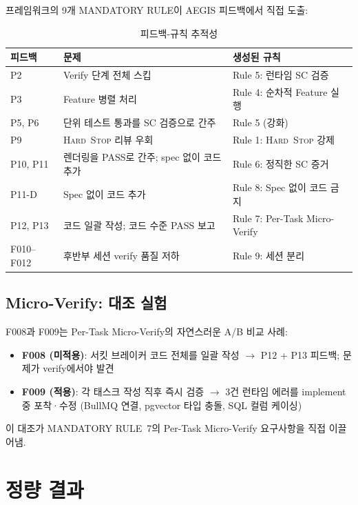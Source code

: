 \documentclass[11pt,a4paper,openright,twoside]{report}
\newcommand{\hardstop}{\textsc{Hard~Stop}}
\begin{document}
프레임워크의 9개 MANDATORY RULE이 AEGIS 피드백에서 직접 도출:

\begin{table}[H]
\centering
\caption{피드백-규칙 추적성}
\label{tab:aegis-rules-ko}
\begin{tabularx}{\textwidth}{lXl}
\toprule
\textbf{피드백} & \textbf{문제} & \textbf{생성된 규칙} \\
\midrule
P2 & Verify 단계 전체 스킵 & Rule 5: 런타임 SC 검증 \\
P3 & Feature 병렬 처리 & Rule 4: 순차적 Feature 실행 \\
P5, P6 & 단위 테스트 통과를 SC 검증으로 간주 & Rule 5 (강화) \\
P9 & \hardstop{} 리뷰 우회 & Rule 1: \hardstop{} 강제 \\
P10, P11 & 렌더링을 PASS로 간주; spec 없이 코드 추가 & Rule 6: 정직한 SC 증거 \\
P11-D & Spec 없이 코드 추가 & Rule 8: Spec 없이 코드 금지 \\
P12, P13 & 코드 일괄 작성; 코드 수준 PASS 보고 & Rule 7: Per-Task Micro-Verify \\
F010--F012 & 후반부 세션 verify 품질 저하 & Rule 9: 세션 분리 \\
\bottomrule
\end{tabularx}
\end{table}

\subsection{Micro-Verify: 대조 실험}

F008과 F009는 Per-Task Micro-Verify의 자연스러운 A/B 비교 사례:

\begin{itemize}[nosep]
  \item \textbf{F008 (미적용)}: 서킷 브레이커 코드 전체를 일괄 작성 $\to$ P12 + P13 피드백; 문제가 verify에서야 발견
  \item \textbf{F009 (적용)}: 각 태스크 작성 직후 즉시 검증 $\to$ 3건 런타임 에러를 implement 중 포착·수정 (BullMQ 연결, pgvector 타입 충돌, SQL 컬럼 케이싱)
\end{itemize}

이 대조가 MANDATORY RULE~7의 Per-Task Micro-Verify 요구사항을 직접 이끌어냄.

\section{정량 결과}
\end{document}
